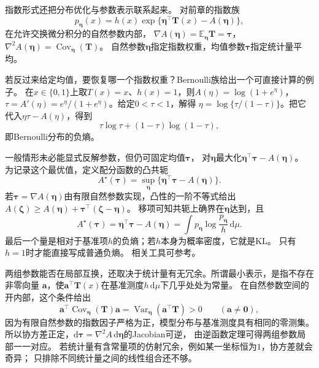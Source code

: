 指数形式还把分布优化与参数表示联系起来。
对前章的指数族
\[
  p_{\bm\eta}(x)
  =h(x)\exp\{\bm\eta^\top\bm T(x)-A(\bm\eta)\},
\]
在允许交换微分积分的自然参数内部，
\(\nabla A(\bm\eta)=\mathbb E_{\bm\eta}\bm T=\bm\tau\)，
\(\nabla^2A(\bm\eta)=\operatorname{Cov}_{\bm\eta}(\bm T)\)。
自然参数\(\bm\eta\)指定指数权重，均值参数\(\bm\tau\)指定统计量平均。

若反过来给定均值，要恢复哪一个指数权重？Bernoulli族给出一个可直接计算的例子。
在\(x\in\{0,1\}\)上取\(T(x)=x\)、\(h(x)=1\)，则\(A(\eta)=\log(1+e^\eta)\)，
\(\tau=A'(\eta)=e^\eta/(1+e^\eta)\)。给定\(0<\tau<1\)，解得
\(\eta=\log\{\tau/(1-\tau)\}\)。把它代入\(\eta\tau-A(\eta)\)，得到
\[
 \tau\log\tau+(1-\tau)\log(1-\tau),
\]
即Bernoulli分布的负熵。

一般情形未必能显式反解参数，但仍可固定均值\(\bm\tau\)，
对\(\bm\eta\)最大化\(\bm\eta^\top\bm\tau-A(\bm\eta)\)。
为记录这个最优值，定义配分函数的凸共轭
\begin{equation}
  A^\star(\bm\tau)
  =\sup_{\bm\eta}\{\bm\eta^\top\bm\tau-A(\bm\eta)\}.
  \label{eq:information-log-partition-conjugate}
\end{equation}
若\(\bm\tau=\nabla A(\bm\eta)\)由有限自然参数实现，凸性的一阶不等式给出
\(A(\bm\zeta)\geq A(\bm\eta)+\bm\tau^\top(\bm\zeta-\bm\eta)\)。
移项可知共轭上确界在\(\bm\eta\)达到，且
\[
  A^\star(\bm\tau)=\bm\eta^\top\bm\tau-A(\bm\eta)
  =\int p_{\bm\eta}\log\frac{p_{\bm\eta}}h\,\mathrm d\mu.
\]
最后一个量是相对于基准项\(h\)的负熵；若\(h\)本身为概率密度，它就是KL。
只有\(h=1\)时才能直接写成普通负熵。
相关工具可参考。

两组参数能否在局部互换，还取决于统计量有无冗余。所谓最小表示，是指不存在非零向量
\(\bm a\)，使\(\bm a^\top\bm T(x)\)在基准测度\(h\,\mathrm d\mu\)下几乎处处为常量。
在自然参数空间的开内部，这个条件给出
\[
 \bm a^\top\operatorname{Cov}_{\bm\eta}(\bm T)\bm a
 =\operatorname{Var}_{\bm\eta}(\bm a^\top\bm T)>0
 \qquad(\bm a\neq\bm0),
\]
因为有限自然参数的指数因子严格为正，模型分布与基准测度具有相同的零测集。
所以协方差正定，\(\mathrm d\bm\tau=\nabla^2A\,\mathrm d\bm\eta\)的Jacobian可逆，
由逆函数定理可得两组参数局部一一对应。
若统计量有含常量项的仿射冗余，例如某一坐标恒为\(1\)，协方差就会奇异；
只排除不同统计量之间的线性组合还不够。

